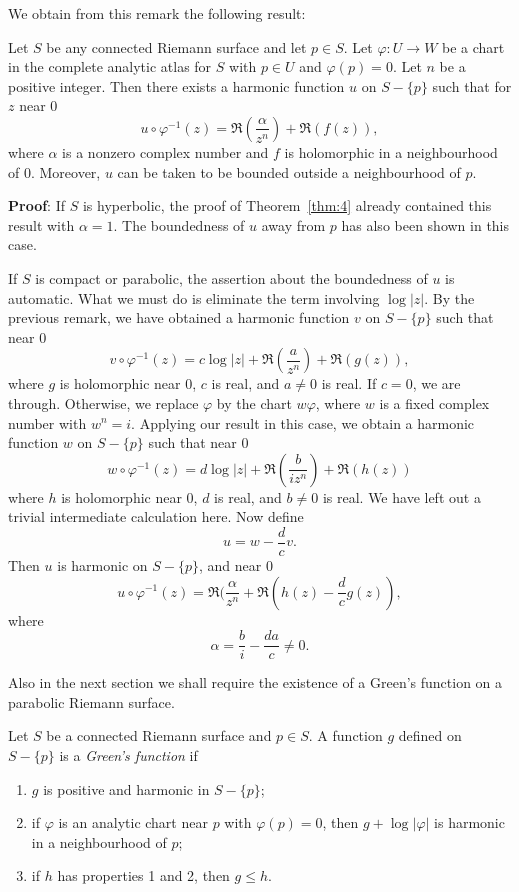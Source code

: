 \documentclass[a4paper,11pt]{article}
\begin{document}
We obtain from this remark the following result:

\begin{cor}
  Let $S$ be any connected Riemann surface and let $p \in S$.  Let
  $\varphi: U \to W$ be a chart in the complete analytic atlas for $S$
  with $p \in U$ and $\varphi(p) = 0$.
  Let $n$ be a positive integer.  Then there exists a harmonic
  function $u$ on $S - \{p\}$ such that for $z$ near 0
  $$
  u \circ \varphi^{-1}(z)
  = \Re(\frac{\alpha}{z^n}) + \Re(f(z)),
  $$
  where $\alpha$ is a nonzero complex number and $f$ is holomorphic in
  a neighbourhood of 0.  Moreover, $u$ can be taken to be bounded
  outside a neighbourhood of $p$.
\end{cor}

\begin{mdframed}
  \textbf{Proof}: If $S$ is hyperbolic, the proof of
  Theorem~\ref{thm:4} already contained this result with $\alpha =
  1$.  The boundedness of $u$ away from $p$ has also been shown in
  this case.

  If $S$ is compact or parabolic, the assertion about the boundedness
  of $u$ is automatic.  What we must do is eliminate the term
  involving $\log|z|$.  By the previous remark, we have obtained a
  harmonic function $v$ on $S - \{p\}$ such that near 0
  $$
  v \circ \varphi^{-1}(z) 
  = c \log|z| + \Re(\frac{a}{z^n}) + \Re(g(z)),
  $$
  where $g$ is holomorphic near 0, $c$ is real, and $a \ne 0$ is
  real.  If $c=0$, we are through.  Otherwise, we replace $\varphi$ by
  the chart $w\varphi$, where $w$ is a fixed complex number with $w^n
  = i$.  Applying our result in this case, we obtain a harmonic
  function $w$ on $S - \{p\}$ such that near 0
  $$
  w \circ \varphi^{-1}(z) = d \log|z| + \Re(\frac{b}{iz^n})
  + \Re(h(z))
  $$
  where $h$ is holomorphic near 0, $d$ is real, and $b \ne 0$ is
  real.  We have left out a trivial intermediate calculation here.
  Now define
  $$
  u = w - \frac{d}{c}v.
  $$
  Then $u$ is harmonic on $S - \{p\}$, and near 0
  $$
  u \circ \varphi^{-1}(z) = \Re(\frac{\alpha}{z^n} + \Re(h(z) -
  \frac{d}{c}g(z)),
  $$
  where
  $$
  \alpha = \frac{b}{i} - \frac{da}{c} \ne 0.
  $$
\end{mdframed}

Also in the next section we shall require the existence of a Green's
function on a parabolic Riemann surface.

\begin{defn}
  \label{def:7}
  Let $S$ be a connected Riemann surface and $p \in S$.  A function
  $g$ defined on $S-\{p\}$ is a \emph{Green's function} if
  \begin{enumerate}
  \item $g$ is positive and harmonic in $S - \{p\}$;
  \item if $\varphi$ is an analytic chart near $p$ with $\varphi(p) =
    0$, then $g + \log|\varphi|$ is harmonic in a neighbourhood of
    $p$;
  \item if $h$ has properties 1 and 2, then $g \le h$.
  \end{enumerate}
\end{defn}
\end{document}
